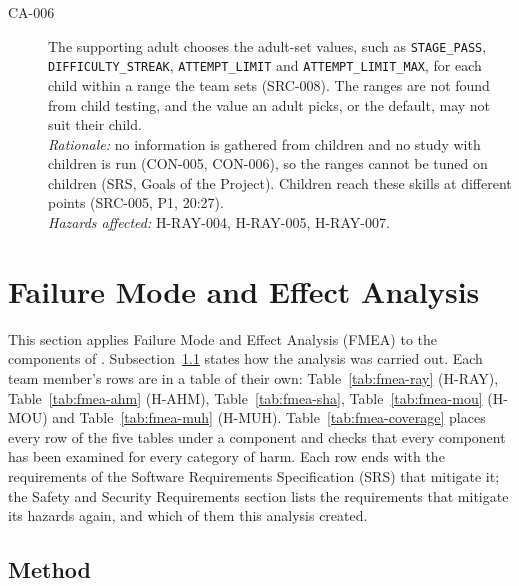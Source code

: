 \documentclass{article}
\begin{document}
\begin{description}
\item[CA-006] The supporting adult chooses the adult-set values, such as
\texttt{STAGE\_PASS}, \texttt{DIFFICULTY\_STREAK}, \texttt{ATTEMPT\_LIMIT} and
\texttt{ATTEMPT\_LIMIT\_MAX}, for each child within a range the team sets (SRC-008). The ranges are not found
from child testing, and the value an adult picks, or the default, may not suit
their child.\\
\emph{Rationale:} no information is gathered from children and no study with
children is run (CON-005, CON-006), so the ranges cannot be tuned on children
(SRS, Goals of the Project). Children reach these skills at different points
(SRC-005, P1, 20:27).\\
\emph{Hazards affected:} H-RAY-004, H-RAY-005, H-RAY-007.
\end{description}

\section{Failure Mode and Effect Analysis}\label{sec:fmea}

This section applies Failure Mode and Effect Analysis (FMEA) to the components
of \progname{}. Subsection~\ref{sec:fmea-method} states how the analysis was
carried out. Each team member's rows are in a table of their own:
Table~\ref{tab:fmea-ray} (H-RAY), Table~\ref{tab:fmea-ahm} (H-AHM),
Table~\ref{tab:fmea-sha}, Table~\ref{tab:fmea-mou} (H-MOU) and
Table~\ref{tab:fmea-muh} (H-MUH). Table~\ref{tab:fmea-coverage} places every row
of the five tables under a component and checks that every component has been
examined for every category of harm. Each row ends with the requirements of the
Software Requirements Specification (SRS) that mitigate it; the Safety and
Security Requirements section lists the requirements that mitigate its hazards
again, and which of them this analysis created.

\subsection{Method}\label{sec:fmea-method}
\end{document}
